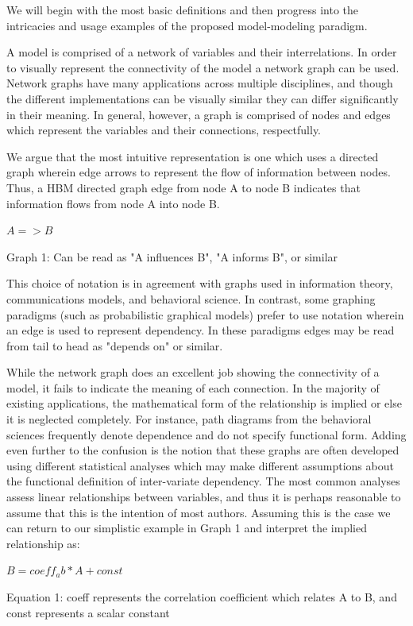 \documentclass[conference]{IEEEtran}
\begin{document}
We will begin with the most basic definitions and then progress into the intricacies and usage examples of the proposed model-modeling paradigm.

A model is comprised of a network of variables and their interrelations.
In order to visually represent the connectivity of the model a network graph can be used.
Network graphs have many applications across multiple disciplines, and though the different implementations can be visually similar they can differ significantly in their meaning.
In general, however, a graph is comprised of nodes and edges which represent the variables and their connections, respectfully. 

We argue that the most intuitive representation is one which uses a directed graph wherein edge arrows to represent the flow of information between nodes.
Thus, a HBM  directed graph edge from node A to node B indicates that information flows from node A into node B. 

$A => B$

Graph 1: Can be read as "A influences B", "A informs B", or similar

This choice of notation is in agreement with graphs used in information theory, communications models, and behavioral science.
In contrast, some graphing paradigms (such as probabilistic graphical models) prefer to use notation wherein an edge is used to represent dependency.
In these paradigms edges may be read from tail to head as "depends on" or similar.

While the network graph does an excellent job showing the connectivity of a model, it fails to indicate the meaning of each connection.
In the majority of existing applications, the mathematical form of the relationship is implied or else it is neglected completely.
For instance, path diagrams from the behavioral sciences frequently denote dependence and do not specify functional form.
Adding even further to the confusion is the notion that these graphs are often developed using different statistical analyses which may make different assumptions about the functional definition of inter-variate dependency.
The most common analyses assess linear relationships between variables, and thus it is perhaps reasonable to assume that this is the intention of most authors.
Assuming this is the case we can return to our simplistic example in Graph 1 and interpret the implied relationship as:

$B = coeff_ab*A + const$

Equation 1: coeff represents the correlation coefficient which relates A to B, 
and const represents a scalar constant
\end{document}
